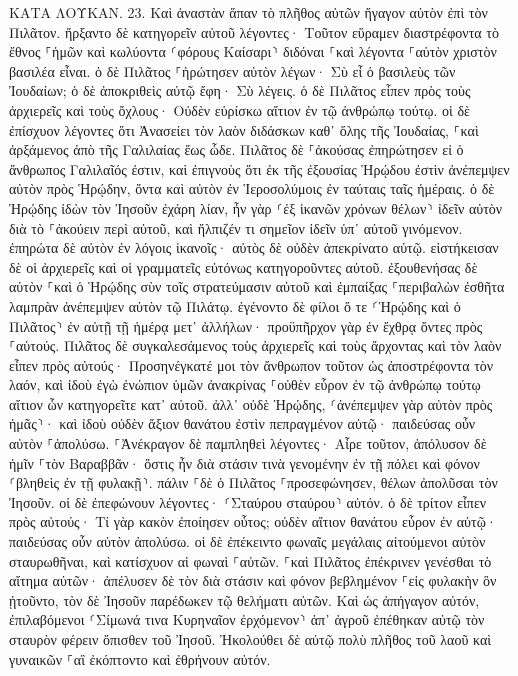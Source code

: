 \documentclass[twoside, 9pt]{extreport}
\begin{document}
ΚΑΤΑ ΛΟΥΚΑΝ.
23.
Καὶ ἀναστὰν ἅπαν τὸ πλῆθος αὐτῶν ἤγαγον αὐτὸν ἐπὶ τὸν Πιλᾶτον. 
ἤρξαντο δὲ κατηγορεῖν αὐτοῦ λέγοντες· Τοῦτον εὕραμεν διαστρέφοντα τὸ ἔθνος ⸀ἡμῶν καὶ κωλύοντα ⸂φόρους Καίσαρι⸃ διδόναι ⸀καὶ λέγοντα ⸀αὑτὸν χριστὸν βασιλέα εἶναι. 
ὁ δὲ Πιλᾶτος ⸀ἠρώτησεν αὐτὸν λέγων· Σὺ εἶ ὁ βασιλεὺς τῶν Ἰουδαίων; ὁ δὲ ἀποκριθεὶς αὐτῷ ἔφη· Σὺ λέγεις. 
ὁ δὲ Πιλᾶτος εἶπεν πρὸς τοὺς ἀρχιερεῖς καὶ τοὺς ὄχλους· Οὐδὲν εὑρίσκω αἴτιον ἐν τῷ ἀνθρώπῳ τούτῳ. 
οἱ δὲ ἐπίσχυον λέγοντες ὅτι Ἀνασείει τὸν λαὸν διδάσκων καθ᾽ ὅλης τῆς Ἰουδαίας, ⸀καὶ ἀρξάμενος ἀπὸ τῆς Γαλιλαίας ἕως ὧδε. 
Πιλᾶτος δὲ ⸀ἀκούσας ἐπηρώτησεν εἰ ὁ ἄνθρωπος Γαλιλαῖός ἐστιν, 
καὶ ἐπιγνοὺς ὅτι ἐκ τῆς ἐξουσίας Ἡρῴδου ἐστὶν ἀνέπεμψεν αὐτὸν πρὸς Ἡρῴδην, ὄντα καὶ αὐτὸν ἐν Ἱεροσολύμοις ἐν ταύταις ταῖς ἡμέραις. 
ὁ δὲ Ἡρῴδης ἰδὼν τὸν Ἰησοῦν ἐχάρη λίαν, ἦν γὰρ ⸂ἐξ ἱκανῶν χρόνων θέλων⸃ ἰδεῖν αὐτὸν διὰ τὸ ⸀ἀκούειν περὶ αὐτοῦ, καὶ ἤλπιζέν τι σημεῖον ἰδεῖν ὑπ᾽ αὐτοῦ γινόμενον. 
ἐπηρώτα δὲ αὐτὸν ἐν λόγοις ἱκανοῖς· αὐτὸς δὲ οὐδὲν ἀπεκρίνατο αὐτῷ. 
εἱστήκεισαν δὲ οἱ ἀρχιερεῖς καὶ οἱ γραμματεῖς εὐτόνως κατηγοροῦντες αὐτοῦ. 
ἐξουθενήσας δὲ αὐτὸν ⸀καὶ ὁ Ἡρῴδης σὺν τοῖς στρατεύμασιν αὐτοῦ καὶ ἐμπαίξας ⸀περιβαλὼν ἐσθῆτα λαμπρὰν ἀνέπεμψεν αὐτὸν τῷ Πιλάτῳ. 
ἐγένοντο δὲ φίλοι ὅ τε ⸂Ἡρῴδης καὶ ὁ Πιλᾶτος⸃ ἐν αὐτῇ τῇ ἡμέρᾳ μετ᾽ ἀλλήλων· προϋπῆρχον γὰρ ἐν ἔχθρᾳ ὄντες πρὸς ⸀αὑτούς. 
Πιλᾶτος δὲ συγκαλεσάμενος τοὺς ἀρχιερεῖς καὶ τοὺς ἄρχοντας καὶ τὸν λαὸν 
εἶπεν πρὸς αὐτούς· Προσηνέγκατέ μοι τὸν ἄνθρωπον τοῦτον ὡς ἀποστρέφοντα τὸν λαόν, καὶ ἰδοὺ ἐγὼ ἐνώπιον ὑμῶν ἀνακρίνας ⸀οὐθὲν εὗρον ἐν τῷ ἀνθρώπῳ τούτῳ αἴτιον ὧν κατηγορεῖτε κατ᾽ αὐτοῦ. 
ἀλλ᾽ οὐδὲ Ἡρῴδης, ⸂ἀνέπεμψεν γὰρ αὐτὸν πρὸς ἡμᾶς⸃· καὶ ἰδοὺ οὐδὲν ἄξιον θανάτου ἐστὶν πεπραγμένον αὐτῷ· 
παιδεύσας οὖν αὐτὸν ⸀ἀπολύσω. 
⸀Ἀνέκραγον δὲ παμπληθεὶ λέγοντες· Αἶρε τοῦτον, ἀπόλυσον δὲ ἡμῖν ⸀τὸν Βαραββᾶν· 
ὅστις ἦν διὰ στάσιν τινὰ γενομένην ἐν τῇ πόλει καὶ φόνον ⸂βληθεὶς ἐν τῇ φυλακῇ⸃. 
πάλιν ⸀δὲ ὁ Πιλᾶτος ⸀προσεφώνησεν, θέλων ἀπολῦσαι τὸν Ἰησοῦν. 
οἱ δὲ ἐπεφώνουν λέγοντες· ⸂Σταύρου σταύρου⸃ αὐτόν. 
ὁ δὲ τρίτον εἶπεν πρὸς αὐτούς· Τί γὰρ κακὸν ἐποίησεν οὗτος; οὐδὲν αἴτιον θανάτου εὗρον ἐν αὐτῷ· παιδεύσας οὖν αὐτὸν ἀπολύσω. 
οἱ δὲ ἐπέκειντο φωναῖς μεγάλαις αἰτούμενοι αὐτὸν σταυρωθῆναι, καὶ κατίσχυον αἱ φωναὶ ⸀αὐτῶν. 
⸀καὶ Πιλᾶτος ἐπέκρινεν γενέσθαι τὸ αἴτημα αὐτῶν· 
ἀπέλυσεν δὲ τὸν διὰ στάσιν καὶ φόνον βεβλημένον ⸀εἰς φυλακὴν ὃν ᾐτοῦντο, τὸν δὲ Ἰησοῦν παρέδωκεν τῷ θελήματι αὐτῶν. 
Καὶ ὡς ἀπήγαγον αὐτόν, ἐπιλαβόμενοι ⸂Σίμωνά τινα Κυρηναῖον ἐρχόμενον⸃ ἀπ᾽ ἀγροῦ ἐπέθηκαν αὐτῷ τὸν σταυρὸν φέρειν ὄπισθεν τοῦ Ἰησοῦ. 
Ἠκολούθει δὲ αὐτῷ πολὺ πλῆθος τοῦ λαοῦ καὶ γυναικῶν ⸀αἳ ἐκόπτοντο καὶ ἐθρήνουν αὐτόν. 
\end{document}
